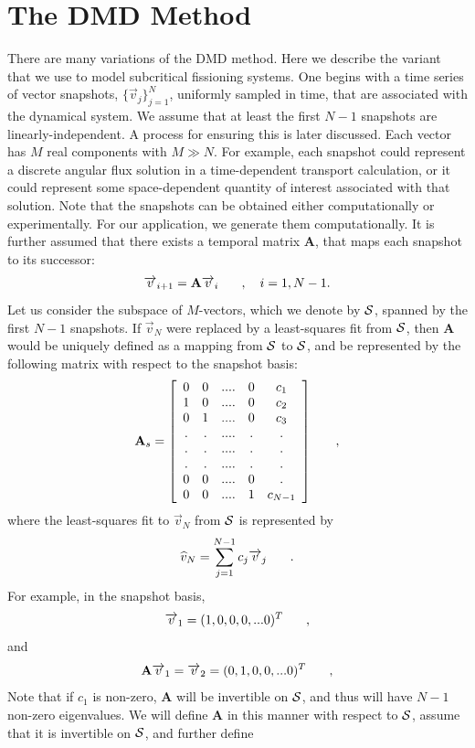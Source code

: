 \documentclass[12pt]{article}
\newcommand{\bracket}[1]{\left[ #1 \right]}
\renewcommand{\vec}[1]{\overrightarrow{#1}}
\newcommand{\be}{\begin{equation}}
\newcommand{\ee}{\end{equation}}
\newcommand{\pec}{\hspace{0.25in},}
\newcommand{\pep}{\hspace{0.25in}.}
\newcommand{\LEQ}[1]{\label{eq:#1}}
\newcommand{\cS}{{\cal S}}
\newcommand{\mA}{\mathbf{A}}
\begin{document}
\section{The DMD Method}
There are many variations of the DMD method.  Here we describe the variant that we use to model subcritical fissioning systems.  
One begins with a time series of vector snapshots, $\{\vec{v}_j\}_{j=1}^{N}$, uniformly sampled in time, that are associated with the 
dynamical system.  We assume that at least the first $N-1$ snapshots are linearly-independent. A process for ensuring this 
is later discussed.  Each vector has $M$ real 
components with $M \gg N$. For example, each snapshot could represent a discrete angular flux solution in a time-dependent 
transport calculation, or it could represent some space-dependent 
quantity of interest associated with that solution.  Note that the snapshots can be obtained either computationally or 
experimentally. For our application, we generate them computationally. It is further assumed that there exists a temporal 
matrix $\mathbf{A}$, that maps each snapshot to its successor:
\be
\vec{v}_{i+1} = \mA \vec{v}_{i} \pec \quad i=1,N-1.
\LEQ{2.1}
\ee
Let us consider the subspace of $M$-vectors, which we denote by $\cS$, spanned by the first $N-1$ snapshots.  If $\vec{v}_N$ 
were replaced by a least-squares fit from $\cS$, then $\mA$ would be uniquely defined as a mapping from $\cS$ to $\cS$, and 
be represented by the following matrix with respect to the snapshot basis:
\be
\mA_s = \bracket{
\begin{array}{ccccccc}
0 & 0 & ....& 0 & c_1 \\
1 & 0 & ....& 0 & c_2 \\
0 & 1 & ....& 0 & c_3 \\
. & . & ....& . & . \\
. & . & ....& . & . \\
. & . & ....& . & . \\
0 & 0 & ....& 0 & . \\
0 & 0 & ....& 1 & c_{N-1}
\end{array}
} \pec
\LEQ{2.2}
\ee
where the least-squares fit to $\vec{v}_N$ from $\cS$ is represented by 
\be
\widehat{v}_N = \sum_{j=1}^{N-1} c_j \vec{v}_j \pep
\LEQ{2.3}
\ee
For example, in the snapshot basis, 
\be
\vec{v}_1 = (1,0,0,0,...0)^T \pec
\LEQ{2.4}
\ee
and 
\be
\mA \vec{v}_1 = \vec{v}_2 = (0,1,0,0,...0)^T \pec
\LEQ{2.5}
\ee
Note that if $c_1$ is non-zero, $\mA$ will be invertible on $\cS$, and thus will have $N-1$ non-zero eigenvalues. 
We will define $\mA$ in this manner with respect to $\cS$, assume that it is invertible on $\cS$, and further define 
\end{document}

